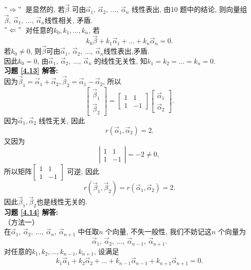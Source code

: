 \documentclass[a4paper]{book}
\begin{document}
$"\Rightarrow"$\  是显然的, 若$\vec{\beta}$ 可由$\vec{\alpha}_1, \ \vec{\alpha}_2, \ \dots,\ \vec{\alpha}_n$ 线性表出, 由10 题中的结论,
则向量组$\vec{\beta},\ \vec{\alpha}_1, \ \dots,\ \vec{\alpha}_n$线性相关, 矛盾.\\
$"\Leftarrow"$\ 对任意的$k_0,k_1,\dots,k_n$, 若
$$k_0\vec{\beta}+k_1\vec{\alpha}_1+\dots+k_n\vec{\alpha}_n=0.$$
若$k_0\not=0$, 则$\vec{\beta}$可由$\vec{\alpha}_1, \ \vec{\alpha}_2, \ \dots,\ \vec{\alpha}_n$线性表出,矛盾. \\
因此$k_0=0$, 由$\vec{\alpha}_1, \ \vec{\alpha}_2, \ \dots,\ \vec{\alpha}_n$ 的线性无关性, 知$k_1=k_2=\dots=k_n=0$.\\
\textbf{习题 \ref{4.13} 解答:}\\
因为$\vec{\beta}_1=\vec{\alpha}_1+\vec{\alpha}_2, \vec{\beta}_2=\vec{\alpha}_1-\vec{\alpha}_2$,
所以\begin{displaymath}\begin{bmatrix}\vec{\beta}_1\\ \vec{\beta}_2\end{bmatrix}=
\begin{bmatrix}1&1\\1&-1\end{bmatrix}\begin{bmatrix}\vec{\alpha}_1\\ \vec{\alpha}_2\end{bmatrix}.\end{displaymath}
因为$\vec{\alpha}_1,\vec{\alpha}_2$ 线性无关, 因此$$r(\vec{\alpha}_1,\vec{\alpha}_2)=2.$$
又因为$$\left|\begin{array}{cc}1&1\\1&-1\end{array}\right|=-2\not=0,$$
所以矩阵$\begin{bmatrix}1&1\\1&-1\end{bmatrix}$ 可逆, 因此$$r(\vec{\beta}_1,\vec{\beta}_2)=r(\vec{\alpha}_1,\vec{\alpha}_2)=2.$$
因此$\vec{\beta}_1,\vec{\beta}_2$也是线性无关的.\\
\textbf{习题 \ref{4.14} 解答:}\\
（方法一）\\
在$\vec{\alpha}_1, \ \vec{\alpha}_2, \ \dots,\ \vec{\alpha}_n,\ \vec{\alpha}_{n+1}$ 中任取$n$ 个向量, 不失一般性, 我们不妨记这$n$ 个向量为$$\vec{\alpha}_1, \ \vec{\alpha}_2, \ \dots,\ \vec{\alpha}_{n-1},\ \vec{\alpha}_{n+1}.$$
对任意的$k_1,k_2,\dots,k_{n-1},k_{n+1}$, 设满足
$$k_1\vec{\alpha}_1+k_2\vec{\alpha}_2+\dots+k_{n-1}\vec{\alpha}_{n-1}+k_{n+1}\vec{\alpha}_{n+1}=0.$$
\end{document}

